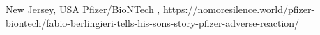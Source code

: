           {New Jersey, USA}
          {}
          {Pfizer/BioNTech}
          {}
          {
            ,
          }
          {https://nomoresilence.world/pfizer-biontech/fabio-berlingieri-tells-his-sons-story-pfizer-adverse-reaction/}

